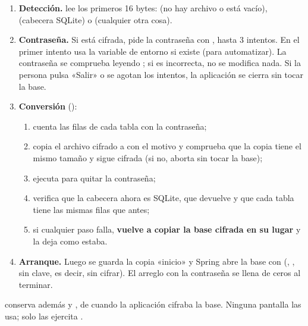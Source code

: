 \begin{enumerate}
	\item \textbf{Detección.}  lee los primeros 16 bytes:
	       (no hay archivo o está vacío),  (cabecera SQLite) o 
	      (cualquier otra cosa).
	\item \textbf{Contraseña.} Si está cifrada,  pide la contraseña con
	      , hasta 3 intentos. En el primer intento usa la variable de
	      entorno  si existe (para automatizar). La contraseña se comprueba leyendo
	      ; si es incorrecta, no se modifica nada. Si la persona pulsa «Salir» o se agotan los
	      intentos, la aplicación se cierra sin tocar la base.
	\item \textbf{Conversión} ():
	      \begin{enumerate}
		      \item cuenta las filas de cada tabla con la contraseña;
		      \item copia el archivo cifrado a  con el motivo  y comprueba que la
		            copia tiene el mismo tamaño y sigue cifrada (si no, aborta sin tocar la base);
		      \item ejecuta  para quitar la contraseña;
		      \item verifica que la cabecera ahora es SQLite, que  devuelve  y que
		            cada tabla tiene las mismas filas que antes;
		      \item si cualquier paso falla, \textbf{vuelve a copiar la base cifrada en su lugar} y la deja como estaba.
	      \end{enumerate}
	\item \textbf{Arranque.} Luego se guarda la copia «inicio» y Spring abre la base con
	       (, , sin clave,
	      es decir, sin cifrar). El arreglo  con la contraseña se llena de ceros al terminar.
\end{enumerate}

 conserva además  y , de cuando la
aplicación cifraba la base. Ninguna pantalla las usa; solo las ejercita .

